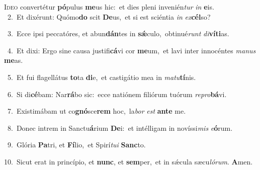 \lettrine{\initial\textcolor{\initialcolor}{I}}{deo} convertétur \textbf{pó}\-pulus \textbf{me}\-us hic:~\star et dies pleni invenién\textit{tur} \textit{in} \textbf{e}\-is.\\
{\numbfont\textcolor{\numbcolor}{~2.}}~Et dixérunt: Quómo\textbf{do} scit \textbf{De}\-us,~\star et si est sciéntia \textit{in} \textit{ex}\-\textbf{cél}so?\par
{\numbfont\textcolor{\numbcolor}{~3.}}~Ecce ipsi peccatóres, et abun\-\textbf{dán}\-tes in \textbf{sǽ}\-culo,~\star obtinué\textit{runt} \textit{di}\-\textbf{ví}\textbf{ti}as.\par
{\numbfont\textcolor{\numbcolor}{~4.}}~Et dixi: Ergo sine causa justifi\-\textbf{cá}\-vi cor \textbf{me}\-um,~\star et lavi inter innocéntes \textit{ma}\-\textit{nus} \textbf{me}\-as.\par
{\numbfont\textcolor{\numbcolor}{~5.}}~Et fui flagellátus \textbf{to}\-ta \textbf{di}\-e,~\star et castigátio mea in \textit{ma}\-\textit{tu}\textbf{tí}nis.\par
{\numbfont\textcolor{\numbcolor}{~6.}}~Si di\-\textbf{cé}\-bam: Nar\-\textbf{rá}\-bo sic:~\star ecce natiónem filiórum tuórum \textit{re}\-\textit{pro}\textbf{bá}vi.\par
{\numbfont\textcolor{\numbcolor}{~7.}}~Existimábam ut co\-\textbf{gnó}\-sce\textbf{rem} hoc,~\star la\textit{bor} \textit{est} \textbf{an}\-\textbf{te} me.\par
{\numbfont\textcolor{\numbcolor}{~8.}}~Donec intrem in Sanctu\-\textbf{á}\-rium \textbf{De}\-i:~\star et intélligam in novíssi\textit{mis} \textit{e}\-\textbf{ó}rum.\par
{\numbfont\textcolor{\numbcolor}{~9.}}~Glória \textbf{Pa}\-tri, et \textbf{Fí}\-lio,~\star et Spirí\-\textit{tu}\-\textit{i} \textbf{Sanc}\-to.\par
{\numbfont\textcolor{\numbcolor}{10.}}~Sicut erat in princípio, et \textbf{nunc}\-, et \textbf{sem}\-per,~\star et in sǽcula sæcu\-\textit{ló}\-\textit{rum}. \textbf{A}\-men.\par
